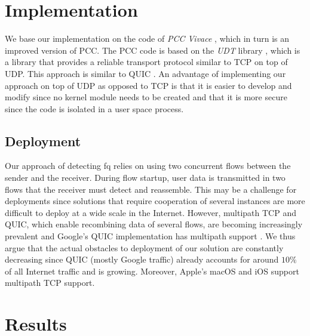 \documentclass[runningheads]{llncs}
\begin{document}
\section{Implementation}

We base our implementation on the code of \textit{PCC Vivace} \cite{dong_pcc_2018}, which in turn is an improved version of PCC. The PCC code is based on the \textit{UDT} library \cite{gu_udt_2007}, which is a library that provides a reliable transport protocol similar to TCP on top of UDP. This approach is similar to QUIC \cite{iyengar_quic_2018}. An advantage of implementing our approach on top of UDP as opposed to TCP is that it is easier to develop and modify since no kernel module needs to be created and that it is more secure since the code is isolated in a user space process. 

\subsection{Deployment}

Our approach of detecting \gls{fq} relies on using two concurrent flows between the sender and the receiver. During flow startup, user data is transmitted in two flows that the receiver must detect and reassemble. This may be a challenge for deployments since solutions that require cooperation of several instances are more difficult to deploy at a wide scale in the Internet. %
However, multipath TCP \cite{handley_tcp_2012} and QUIC, which enable recombining data of several flows, are becoming increasingly prevalent and Google's QUIC implementation has multipath support \cite{google_quiche_2020}. We thus argue that the actual obstacles to deployment of our solution are constantly decreasing since QUIC (mostly Google traffic) already accounts for around %
$10\%$ of all Internet traffic \cite{ruth_first_2018} and is growing. Moreover, Apple's macOS and iOS support multipath TCP \cite{apple_about_2018} support. 

\section{Results}
\end{document}

